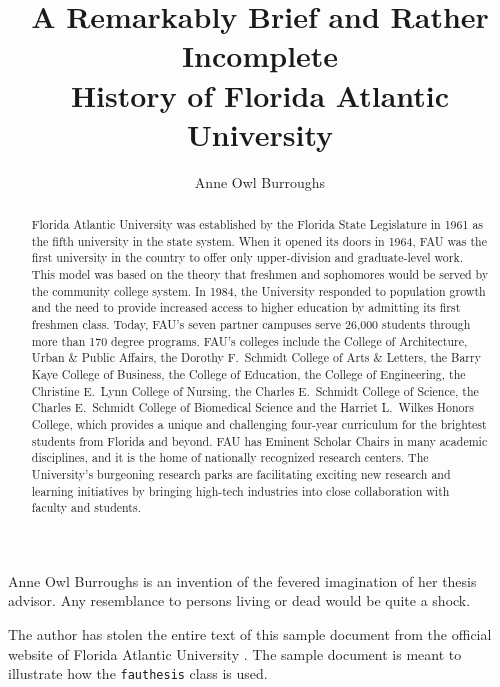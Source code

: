 \documentclass[phd, 12pt, print]{fauthesis}
\title{A Remarkably Brief and Rather Incomplete\\ History of Florida Atlantic University}
\author{Anne Owl Burroughs}
\begin{document}
\frontmatter

\maketitle
\makecopyright
\makesignature

\begin{vita}													%
Anne Owl Burroughs is an invention of the fevered imagination of her thesis advisor.  Any resemblance to persons living or dead would be quite a shock.
\end{vita}

\begin{acknowledgements}
The author has stolen the entire text of this sample document from the official website of Florida Atlantic University \cite{HFAU}.  The sample document is meant to illustrate how the \texttt{fauthesis} class is used.
\end{acknowledgements}

\begin{abstract}
Florida Atlantic University was established by the Florida State Legislature in 1961 as the fifth university in the state system.  When it opened its doors in 1964, FAU was the first university in the country to offer only upper-division and graduate-level work.  This model was based on the theory that freshmen and sophomores would be served by the community college system.  In 1984, the University responded to population growth and the need to provide increased access to higher education by admitting its first freshmen class.  Today, FAU's seven partner campuses serve 26,000 students through more than 170 degree programs.  FAU's colleges include the College of Architecture, Urban \& Public Affairs, the Dorothy F.~Schmidt College of Arts \& Letters, the Barry Kaye College of Business, the College of Education, the College of Engineering, the Christine E.~Lynn College of Nursing, the Charles E.~Schmidt College of Science, the Charles E.~Schmidt College of Biomedical Science and the Harriet L.~Wilkes Honors College, which provides a unique and challenging four-year curriculum for the brightest students from Florida and beyond.  FAU has Eminent Scholar Chairs in many academic disciplines, and it is the home of nationally recognized research centers.  The University's burgeoning research parks are facilitating exciting new research and learning initiatives by bringing high-tech industries into close collaboration with faculty and students.
\end{abstract}
\end{document}
